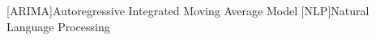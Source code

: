 \begin{acronym}[ARIMA]
[ARIMA]{Autoregressive Integrated Moving Average Model}
[NLP]{Natural Language Processing}
\end{acronym}